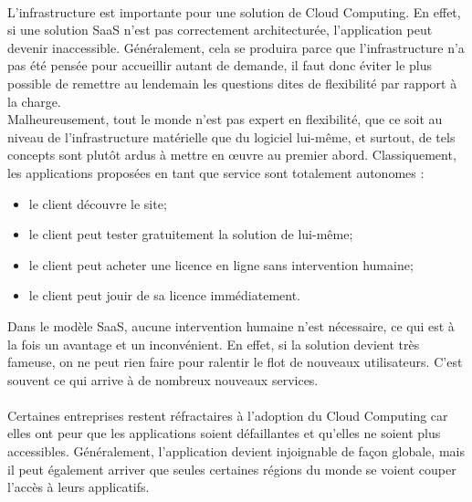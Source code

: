 \documentclass[a4paper,12pt]{report}
\begin{document}
\begin{onehalfspace}
	\paragraph*{}
	L'infrastructure est importante pour une solution de Cloud Computing. En effet, si une solution SaaS n'est pas correctement architecturée, l'application peut devenir inaccessible.	Généralement, cela se produira parce que l'infrastructure n'a pas été pensée pour accueillir autant de demande, il faut donc éviter le plus possible de remettre au lendemain les questions dites de flexibilité par rapport à la charge.\\
	Malheureusement, tout le monde n'est pas expert en flexibilité, que ce soit au niveau de l'infrastructure matérielle que du logiciel lui-même, et surtout, de tels concepts sont plutôt ardus à mettre en œuvre au premier abord. Classiquement, les applications proposées en tant que service sont totalement autonomes :
	\begin{itemize}
\item le client découvre le site;
\item le client peut tester gratuitement la solution de lui-même;
\item le client peut acheter une licence en ligne sans intervention humaine;
\item le client peut jouir de sa licence immédiatement.
	\end{itemize}
	Dans le modèle SaaS, aucune intervention humaine n'est nécessaire, ce qui est à la fois un avantage et un inconvénient. En effet, si la solution devient très fameuse, on ne peut rien faire pour ralentir le flot de nouveaux utilisateurs. C'est souvent ce qui arrive à de nombreux nouveaux services.
	
	\paragraph*{}
	Certaines entreprises restent réfractaires à l'adoption du Cloud Computing car elles ont peur que les applications soient défaillantes et qu'elles ne soient plus accessibles. Généralement, l'application devient injoignable de façon globale, mais il peut également arriver que seules certaines régions du monde se voient couper l'accès à leurs applicatifs.
	

\end{onehalfspace}
\end{document}
